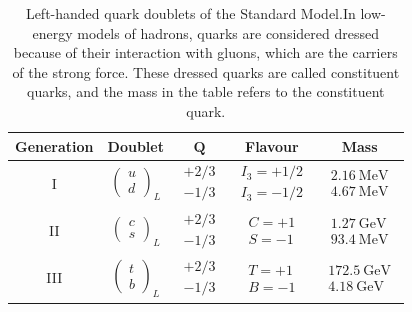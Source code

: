 \documentclass[11pt,a4paper,twoside,openright]{report}
\begin{document}
\begin{table}[H]
    \centering
    \begin{tabular*}{\textwidth}{@{\extracolsep{\fill}}ccccc@{}}
        \toprule
        \textbf{Generation} & \textbf{Doublet} & $\boldsymbol{Q}$ & \textbf{Flavour} & \textbf{Mass} \\
        \midrule
        I &
        $\begin{pmatrix} u \\ d \end{pmatrix}_L$ &
        $\begin{matrix} +2/3 \\ -1/3 \end{matrix}$ &
        $\begin{matrix} I_3 = +1/2 \\ I_3 = -1/2 \end{matrix}$ &
        $\begin{matrix} 2.16~\text{MeV} \\ 4.67~\text{MeV} \end{matrix}$ \\
        \midrule
        II &
        $\begin{pmatrix} c \\ s \end{pmatrix}_L$ &
        $\begin{matrix} +2/3 \\ -1/3 \end{matrix}$ &
        $\begin{matrix} C = +1 \\ S = -1 \end{matrix}$ &
        $\begin{matrix} 1.27~\text{GeV} \\ 93.4~\text{MeV} \end{matrix}$ \\
        \midrule
        III &
        $\begin{pmatrix} t \\ b \end{pmatrix}_L$ &
        $\begin{matrix} +2/3 \\ -1/3 \end{matrix}$ &
        $\begin{matrix} T = +1 \\ B = -1 \end{matrix}$ &
        $\begin{matrix} 172.5~\text{GeV} \\ 4.18~\text{GeV} \end{matrix}$ \\
        \bottomrule
    \end{tabular*}
    \caption{Left-handed quark doublets of the Standard Model.In low-energy models of hadrons, quarks are considered dressed because of their interaction with gluons, which are the carriers of the strong force. These dressed quarks are called constituent quarks, and the mass in the table refers to the constituent quark.}
    \label{tab:quarks}
\end{table}
\end{document}

